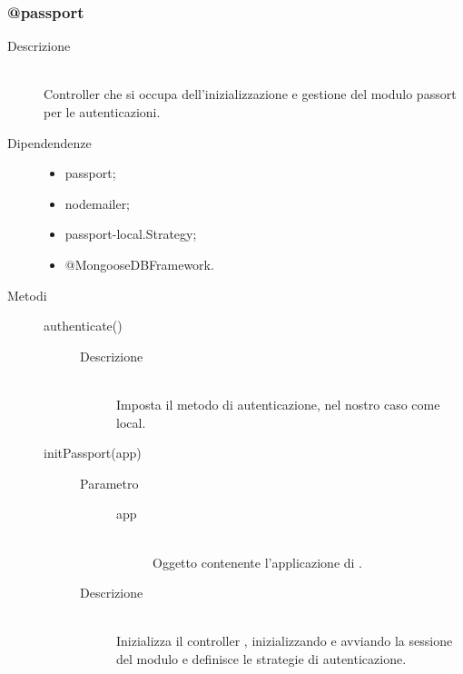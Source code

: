 \subsubsection{@passport}
\begin{description}
 \item[Descrizione] \hfill \\
Controller che si occupa dell'inizializzazione e gestione del modulo passort per le autenticazioni.
\item[Dipendendenze] \hfill
  \begin{itemize}
   \item passport;
   \item nodemailer;
   \item passport-local.Strategy;
   \item @MongooseDBFramework.
  \end{itemize}
   \item[Metodi] \hfill
    \begin{description}
     \item[authenticate()] \hfill 
      \begin{description}
        \item[Descrizione] \hfill \\
          Imposta il metodo di autenticazione, nel nostro caso come local.
      \end{description}
     
     \item[initPassport(app)] \hfill 
     \begin{description}
          \item[Parametro] \hfill
          \begin{description}
           \item[app] \hfill \\
           Oggetto contenente l'applicazione di .
          \end{description}
          \item[Descrizione] \hfill \\
          Inizializza il controller , inizializzando e avviando la sessione del modulo  e definisce le strategie di autenticazione.
            \end{description}
    

\end{description}
\end{description}
